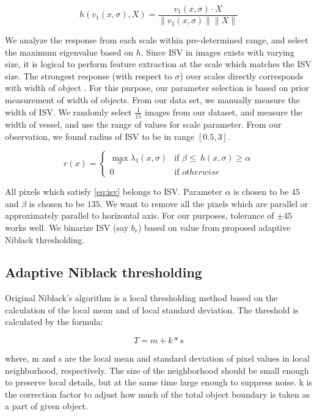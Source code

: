 \begin{equation}
h(v_{1}(x,\sigma), X) = \frac{v_{1}(x,\sigma) \cdot X}{\|v_{1}(x,\sigma)\|\|X\|}
\end{equation}

We analyze the response from each scale within pre-determined range, and select the maximum eigenvalue based on $h$. Since ISV in images exists with varying size, it is logical to perform feature extraction at the scale which matches the ISV size. The strongest response (with respect to $\sigma$) over scales directly corresponds with width of object \cite{Lindeberg96}. For this purpose, our parameter selection is based on prior measurement of width of objects. From our data set, we manually measure the width of ISV. We randomly select $\frac{1}{15}$ images from our dataset, and measure the width of vessel, and use the range of values for scale parameter. From our observation, we found radius of ISV to be in range $[0.5, 3]$.

\begin{equation}\label{eq:isv}
r(x) = \begin{cases} \max_{\sigma} \lambda_{1}(x,\sigma) &\mbox{if } \beta \leq\ h(x, \sigma) \geq \alpha\\ 
0 & \mbox{if } otherwise \end{cases} 
\end{equation}
 
All pixels which satisfy \eqref{eq:isv} belongs to ISV. Parameter $\alpha$ is chosen to be $45$ and $\beta$ is chosen to be $135$. We want to remove all the pixels which are parallel or approximately parallel to horizontal axis. For our purposes, tolerance of $\pm45$ works well. We binarize ISV (say $b_{r}$) based on value from proposed adaptive Niblack thresholding.


\subsection{Adaptive Niblack thresholding}

Original Niblack's algorithm \cite{niblack1985} is a local thresholding method based on the calculation of the local mean and of local standard deviation. The threshold is calculated by the formula:

\begin{equation}\label{eq:niblack}
T = m + k*s
\end{equation}

where, m and s are the local mean and standard deviation of pixel values in local neighborhood, respectively. The size of the
neighborhood should be small enough to preserve local details, but at the same time large enough to suppress noise. k is the correction factor to adjust how much of the total object boundary is taken as a part of given object.
 
